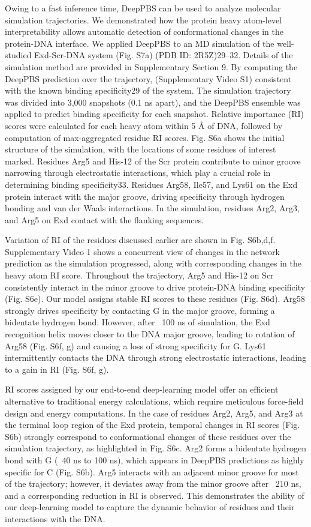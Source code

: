 Owing to a fast inference time, DeepPBS can be used to analyze molecular simulation trajectories. We demonstrated how the protein heavy atom-level interpretability allows automatic detection of conformational changes in the protein-DNA interface. We applied DeepPBS to an MD simulation of the well-studied Exd-Scr-DNA system (Fig. S7a) (PDB ID: 2R5Z)29–32. Details of the simulation method are provided in Supplementary Section 9. By computing the DeepPBS prediction over the trajectory, (Supplementary Video S1) consistent with the known binding specificity29 of the system. The
simulation trajectory was divided into 3,000 snapshots (0.1 ns apart), and the DeepPBS ensemble was applied to predict binding specificity for each snapshot. Relative importance (RI) scores were calculated for each heavy atom within 5 Å of DNA, followed by computation of max-aggregated residue RI scores. Fig. S6a shows the initial structure of the simulation, with the locations of some residues of interest marked. Residues Arg5 and His-12 of the Scr protein contribute to minor groove narrowing through electrostatic interactions, which play a crucial role in determining binding specificity33. 
Residues Arg58, Ile57, and Lys61 on the Exd protein interact with the major groove, driving specificity through hydrogen bonding and van der Waals interactions. In the simulation, residues Arg2, Arg3, and Arg5 on Exd contact with the flanking sequences. 

Variation of RI of the residues discussed earlier are shown in Fig. S6b,d,f. Supplementary Video 1 shows a concurrent view of changes in the network prediction as the simulation progressed, along with corresponding changes in the heavy atom RI score. Throughout the trajectory, Arg5 and His-12 on Scr consistently interact in the minor groove to drive protein-DNA binding specificity (Fig. S6e). Our model assigns stable RI scores to these residues (Fig. S6d). Arg58 strongly drives specificity by contacting G in the major groove, forming a bidentate hydrogen bond. However, after ~100 ns of simulation, the Exd recognition helix moves closer to the DNA major groove, leading to rotation of Arg58 (Fig. S6f, g) and causing a loss of strong specificity for G. Lys61 intermittently contacts the DNA through strong electrostatic interactions, leading to a gain in RI (Fig. S6f, g). 

RI scores assigned by our end-to-end deep-learning model offer an efficient alternative to traditional energy calculations, which require meticulous force-field design and energy computations. In the case of residues Arg2, Arg5, and Arg3 at the terminal loop region of the Exd protein, temporal changes in RI scores (Fig. S6b) strongly correspond to conformational changes of these residues over the simulation trajectory, as highlighted in Fig. S6c. Arg2 forms a bidentate hydrogen bond with G (~40 ns to 100 ns), which appears in DeepPBS predictions as highly specific for C (Fig. S6b). Arg5 interacts with an adjacent minor groove for most of the trajectory; however, it deviates away from the minor groove after ~210 ns, and a corresponding reduction in RI is observed. This demonstrates the ability of our deep-learning model to capture the dynamic behavior of residues and their interactions with the DNA.

